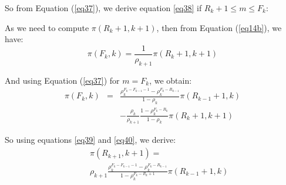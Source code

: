 \documentclass[conference]{IEEEtran}
\begin{document}
So from Equation (\ref{eq37}), we derive equation \ref{eq38} if  $R_k+1 \leq m \leq F_k$:




As we need to compute $\pi(R_{k}+1, k+1)$, then from Equation (\ref{eq14b}), we have:
\begin{equation}
\pi(F_{k},k)= \frac{1}{\rho_{k+1}} \pi(R_{k}+1,k+1)
\label{eq39}
\end{equation}


And using Equation (\ref{eq37}) for $m=F_k$, we obtain:
\begin{eqnarray}
\pi(F_k,k)&=& \frac{ \rho_k ^{F_k-F_{k-1}-1} -\rho_k^{F_k-R_{k-1}} } {1-\rho_k} \pi(R_{k-1}+1,k) \nonumber \\
&&- \frac{\rho_k}{\rho_{k+1}} \frac{1- \rho_k ^{F_k-R_k}} {1-\rho_k} \pi(R_{k}+1, k+1)
 \label{eq40}
\end{eqnarray}


So using equations \ref{eq39} and \ref{eq40}, we derive:
\begin{eqnarray}
&&\pi(R_{k+1},k+1)= \nonumber\\
&&\rho_{k+1} \frac{ \rho_k^{F_k-F_{k-1}-1}
-\rho_k^{F_k-R_{k-1}} } { 1- \rho_k^{F_k-R_{k}+1}} \pi(R_{k-1}+1,k)
\label{eq50}
\end{eqnarray}


\end{document}

